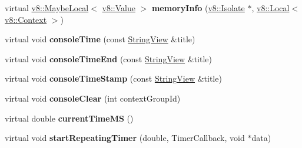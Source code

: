 \begin{DoxyCompactItemize}
\item 
\mbox{\label{classv8__inspector_1_1V8InspectorClient_aa0ae6992f007803302cb64d3d0461a20}} 
virtual \mbox{\hyperlink{classv8_1_1MaybeLocal}{v8\+::\+Maybe\+Local}}$<$ \mbox{\hyperlink{classv8_1_1Value}{v8\+::\+Value}} $>$ {\bfseries memory\+Info} (\mbox{\hyperlink{classv8_1_1Isolate}{v8\+::\+Isolate}} $\ast$, \mbox{\hyperlink{classv8_1_1Local}{v8\+::\+Local}}$<$ \mbox{\hyperlink{classv8_1_1Context}{v8\+::\+Context}} $>$)
\item 
\mbox{\label{classv8__inspector_1_1V8InspectorClient_a7b0e3b6ae4473671ed80e38153cbcec9}} 
virtual void {\bfseries console\+Time} (const \mbox{\hyperlink{classv8__inspector_1_1StringView}{String\+View}} \&title)
\item 
\mbox{\label{classv8__inspector_1_1V8InspectorClient_a914e850d1e61bfe2fce9f74022ab7a98}} 
virtual void {\bfseries console\+Time\+End} (const \mbox{\hyperlink{classv8__inspector_1_1StringView}{String\+View}} \&title)
\item 
\mbox{\label{classv8__inspector_1_1V8InspectorClient_a2e4593fbf351c48a21006a36db1cc3cd}} 
virtual void {\bfseries console\+Time\+Stamp} (const \mbox{\hyperlink{classv8__inspector_1_1StringView}{String\+View}} \&title)
\item 
\mbox{\label{classv8__inspector_1_1V8InspectorClient_a05b99b6be7f74d53a743e16592d6e38f}} 
virtual void {\bfseries console\+Clear} (int context\+Group\+Id)
\item 
\mbox{\label{classv8__inspector_1_1V8InspectorClient_ac27be4891cda5413f6156df6c98dc831}} 
virtual double {\bfseries current\+Time\+MS} ()
\item 
\mbox{\label{classv8__inspector_1_1V8InspectorClient_a33a58cb593cb4a4fefae32ec2c23ac72}} 
virtual void {\bfseries start\+Repeating\+Timer} (double, Timer\+Callback, void $\ast$data)
\item 
\mbox{\label{classv8__inspector_1_1V8InspectorClient_afb117003d8793ca5fdf3a7aabd909936}} 

\end{DoxyCompactItemize}

